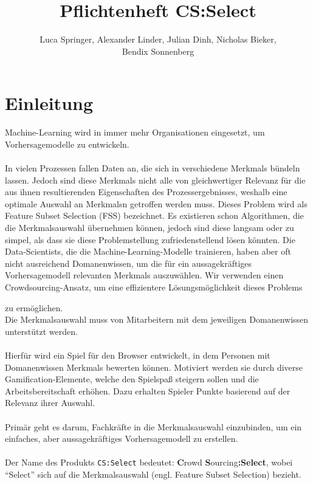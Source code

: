 \documentclass[a4paper]{scrreprt}
\begin{document}
    \title{Pflichtenheft CS:Select}
    \author{Luca Springer, Alexander Linder, Julian Dinh, Nicholas Bieker,\\ Bendix Sonnenberg}
    \maketitle

    \tableofcontents

    \chapter{Einleitung}
    Machine-Learning wird in immer mehr Organisationen eingesetzt, um Vorhersagemodelle zu entwickeln.\\\\
    In vielen Prozessen fallen Daten an, die sich in verschiedene \Glspl{Merkmal} bündeln lassen.
    Jedoch sind diese \Glspl{Merkmal} nicht alle von gleichwertiger Relevanz für die aus ihnen resultierenden Eigenschaften des Prozessergebnisses, weshalb eine optimale Auswahl an \Glspl{Merkmal}n getroffen werden muss.
    Dieses Problem wird als Feature Subset Selection (FSS) bezeichnet.
    Es existieren schon Algorithmen, die die Merkmalsauswahl übernehmen können, jedoch sind diese langsam oder zu simpel, als dass sie diese Problemstellung zufriedenstellend lösen könnten.
    Die Data-Scientists, die die Machine-Learning-Modelle trainieren, haben aber oft nicht ausreichend \Gls{Domanenwissen}, um die für ein aussagekräftiges Vorhersagemodell relevanten \Glspl{Merkmal} auszuwählen.
    Wir verwenden einen Crowdsourcing-Ansatz, um eine effizientere Lösungsmöglichkeit dieses Problems 
    zu ermöglichen.\\
    Die Merkmalsauswahl muss von Mitarbeitern mit dem jeweiligen \Gls{Domanenwissen} unterstützt werden.\\\\
    Hierfür wird ein \Gls{Spiel} für den Browser entwickelt, in dem Personen mit \Gls{Domanenwissen} \Glspl{Merkmal} bewerten können.
    Motiviert werden sie durch diverse Gamification-Elemente, welche den Spielspaß steigern sollen und die Arbeitsbereitschaft erhöhen.
    Dazu erhalten Spieler Punkte basierend auf der Relevanz ihrer Auswahl.\\\\
    Primär geht es darum, Fachkräfte in die Merkmalsauswahl einzubinden, um ein einfaches, aber aussagekräftiges Vorhersagemodell zu erstellen.\\\\
    Der Name des Produkts \texttt{CS:Select} bedeutet: \textbf{C}rowd \textbf{S}ourcing\textbf{:Select}, wobei \enquote{Select} sich auf die Merkmalsauswahl (engl. Feature Subset Selection) bezieht.
\end{document}
